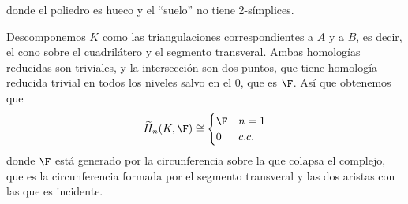 \documentclass[twoside]{article}
\begin{document}
\begin{solucion}
donde el poliedro es hueco y el ``suelo'' no tiene 2-símplices.

Descomponemos $K$ como las triangulaciones correspondientes a $A$ y a $B$, es decir, el cono sobre el cuadrilátero y el segmento transveral. Ambas homologías reducidas son triviales, y la intersección son dos puntos, que tiene homología reducida trivial en todos los niveles salvo en el 0, que es $\F$.  Así que obtenemos que 
\[
\widetilde{H}_n(K,\F)\cong \begin{cases}
\F & n=1\\
0 & c.c.
\end{cases}
\]
donde $\F$ está generado por la circunferencia sobre la que colapsa el complejo, que es la circunferencia formada por el segmento transveral y las dos aristas con las que es incidente. 
\end{solucion}
\newpage
\end{document}
